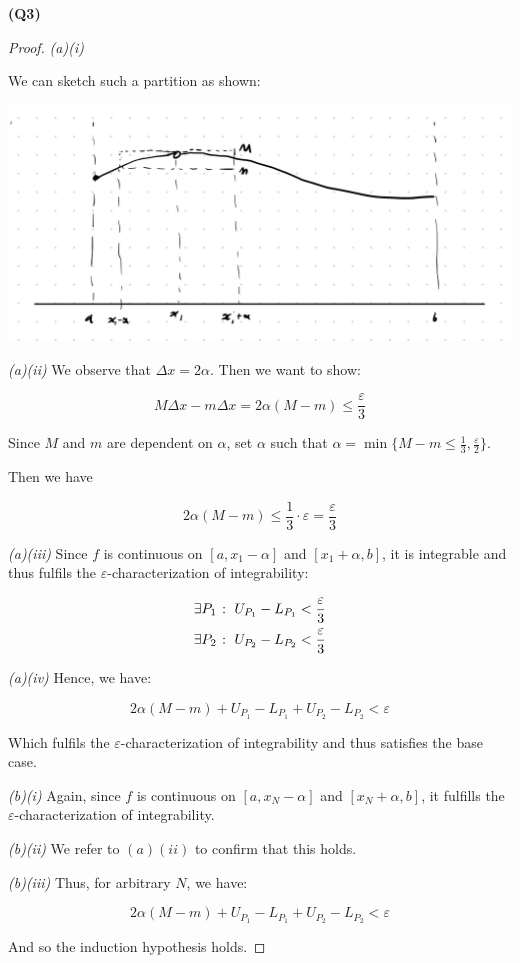 \documentclass[12pt, a4paper]{article}
\begin{document}
\textbf{(Q3)}

\begin{proof}

\textit{(a)(i)}

We can sketch such a partition as shown:

\includegraphics[width=\textwidth]{q3sketch.jpg}

\textit{(a)(ii)} We observe that $\Delta x = 2\alpha$. Then we want to show:

\[
    M \Delta x - m \Delta x = 2 \alpha (M - m) \leq \frac{\varepsilon}{3}
\]

Since $M$ and $m$ are dependent on $\alpha$, set $\alpha$ such that
$\alpha = \min \{M - m \leq \frac{1}{3}, \frac{\varepsilon}{2}\}$.

Then we have

\[
    2 \alpha (M - m) \leq \frac{1}{3} \cdot \varepsilon
    = \frac{\varepsilon}{3}
\]

\textit{(a)(iii)} Since $f$ is continuous on $[a, x_1 - \alpha]$ and
$[x_1 + \alpha, b]$, it is integrable and thus fulfils the
$\varepsilon$-characterization of integrability:

\begin{gather*}
    \exists P_1 \; \colon \; U_{P_{1}} - L_{P_{1}} < \frac{\varepsilon}{3}\\
    \exists P_2 \; \colon \; U_{P_{2}} - L_{P_{2}} < \frac{\varepsilon}{3}
\end{gather*}

\textit{(a)(iv)} Hence, we have:

\[
    2 \alpha (M - m) + U_{P_{1}} - L_{P_{1}} + U_{P_{2}} - L_{P_{2}} < \varepsilon
\]

Which fulfils the $\varepsilon$-characterization of integrability and thus
satisfies the base case.

\textit{(b)(i)} Again, since $f$ is continuous on $[a, x_N - \alpha]$
and $[x_N + \alpha, b]$, it fulfills the $\varepsilon$-characterization
of integrability.

\textit{(b)(ii)} We refer to $(a)(ii)$ to confirm that this holds.

\textit{(b)(iii)} Thus, for arbitrary $N$, we have:

\[
    2 \alpha (M - m) + U_{P_{1}} - L_{P_{1}} + U_{P_{2}} - L_{P_{2}} < \varepsilon
\]

And so the induction hypothesis holds.

\end{proof}
\end{document}
